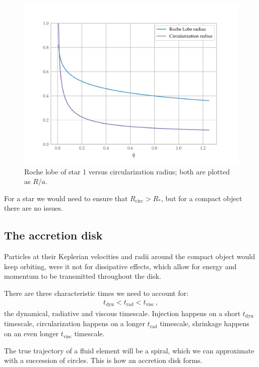 \documentclass[main.tex]{subfiles}
\begin{document}
\begin{figure}[ht]
\centering
\includegraphics[width=\textwidth]{figures/roche-vs-circularization}
\caption{Roche lobe of star 1 versus circularization radius; both are plotted as \(R / a\).}
\label{fig:roche-vs-circularization}
\end{figure}

For a star we would need to ensure that \(R _{\text{circ}} > R_{*}\), but for a compact object there are no issues.

\subsection{The accretion disk}

Particles at their Keplerian velocities and radii around the compact object would keep orbiting, were it not for dissipative effects, which allow for energy and momentum to be transmitted throughout the disk.

There are three characteristic times we need to account for: 
%
\begin{align}
t _{\text{dyn}} < t _{\text{rad}} < t _{\text{visc}}
\,,
\end{align}
%
the dynamical, radiative and viscous timescale. Injection happens on a short \(t _{\text{dyn}}\) timescale, circularization happens on a longer \(t _{\text{rad}}\) timescale, shrinkage happens on an even longer \(t _{\text{visc}}\) timescale.

The true trajectory of a fluid element will be a spiral, which we can approximate with a succession of circles.
This is how an accretion disk forms. 
\end{document}
